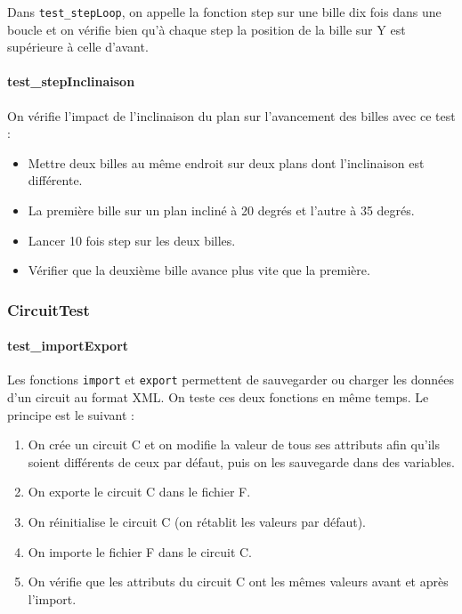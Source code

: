 \documentclass{report}
\begin{document}
Dans \texttt{test\_stepLoop}, on appelle la fonction step sur une bille dix fois dans une boucle et on vérifie bien qu’à chaque step la position de la bille sur Y est supérieure à celle d’avant.

\paragraph{test\_stepInclinaison}

On vérifie l’impact de l’inclinaison du plan sur l’avancement des billes avec ce test :
\begin{itemize}
\item Mettre deux billes au même endroit sur deux plans dont l’inclinaison est différente.
\item La première bille sur un plan incliné à 20 degrés et l’autre à 35 degrés. 
\item Lancer 10 fois step sur les deux billes.
\item Vérifier que la deuxième bille avance plus vite que la première.
\end{itemize}

\subsubsection{CircuitTest}

\paragraph{test\_importExport}

Les fonctions \texttt{import} et \texttt{export} permettent de sauvegarder ou charger les données d’un circuit au format XML. On teste ces deux fonctions en même temps. Le principe est le suivant : 
\begin{enumerate}
\item On crée un circuit C et on modifie la valeur de tous ses attributs afin qu’ils soient différents de ceux par défaut, puis on les sauvegarde dans des variables.
\item On exporte le circuit C dans le fichier F.
\item On réinitialise le circuit C (on rétablit les valeurs par défaut).
\item On importe le fichier F dans le circuit C.
\item On vérifie que les attributs du circuit C ont les mêmes valeurs avant et après l’import.
\end{enumerate}
\end{document}
